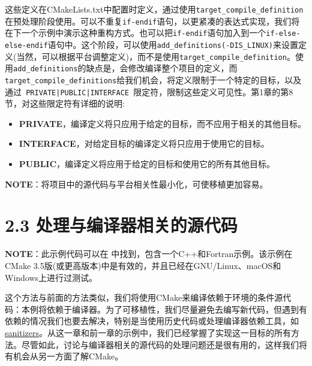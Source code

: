 这些定义在CMakeLists.txt中配置时定义，通过使用\texttt{target\_compile\_definition}在预处理阶段使用。可以不重复\texttt{if-endif}语句，以更紧凑的表达式实现，我们将在下一个示例中演示这种重构方式。也可以把\texttt{if-endif}语句加入到一个\texttt{if-else-else-endif}语句中。这个阶段，可以使用\texttt{add\_definitions(-DIS\_LINUX)}来设置定义(当然，可以根据平台调整定义)，而不是使用\texttt{target\_compile\_definition}。使用\texttt{add\_definitions}的缺点是，会修改编译整个项目的定义，而\texttt{target\_compile\_definitions}给我们机会，将定义限制于一个特定的目标，以及通过\texttt{ PRIVATE|PUBLIC|INTERFACE }限定符，限制这些定义可见性。第1章的第8节，对这些限定符有详细的说明:

\begin{itemize}
\item \textbf{PRIVATE}，编译定义将只应用于给定的目标，而不应用于相关的其他目标。

\item \textbf{INTERFACE}，对给定目标的编译定义将只应用于使用它的目标。

\item \textbf{PUBLIC}，编译定义将应用于给定的目标和使用它的所有其他目标。

\end{itemize}

\begin{myInfoBox}
\textbf{NOTE}：将项目中的源代码与平台相关性最小化，可使移植更加容易。
\end{myInfoBox}


\section{2.3 处理与编译器相关的源代码}

\begin{myInfoBox}
\textbf{NOTE}：此示例代码可以在  中找到，包含一个C++和Fortran示例。该示例在CMake 3.5版(或更高版本)中是有效的，并且已经在GNU/Linux、macOS和Windows上进行过测试。
\end{myInfoBox}

这个方法与前面的方法类似，我们将使用CMake来编译依赖于环境的条件源代码：本例将依赖于编译器。为了可移植性，我们尽量避免去编写新代码，但遇到有依赖的情况我们也要去解决，特别是当使用历史代码或处理编译器依赖工具，如\href{https://github.com/google/sanitizers}{sanitizers}。从这一章和前一章的示例中，我们已经掌握了实现这一目标的所有方法。尽管如此，讨论与编译器相关的源代码的处理问题还是很有用的，这样我们将有机会从另一方面了解CMake。

